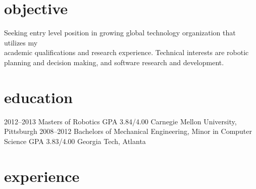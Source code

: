 \documentclass[]{friggeri-cv} %
\begin{document}
\section{objective}
Seeking entry level position in growing global technology organization that utilizes my \\
academic qualifications and research experience. Technical interests are robotic planning and decision making, and software research and development.


\section{education}

\begin{entrylist}
\eduentry
{2012--2013}
{Masters {\normalfont of Robotics}}
{GPA 3.84/4.00}
{Carnegie Mellon University, Pittsburgh}
\eduentry
{2008--2012}
{Bachelors {\normalfont of Mechanical Engineering, Minor in Computer Science}}
{GPA 3.83/4.00}
{Georgia Tech, Atlanta}
\end{entrylist}

\vspace{-2mm}
\section{experience}
\end{document}
